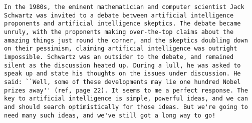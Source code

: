 \begin{lstlisting}
In the 1980s, the eminent mathematician and computer scientist Jack Schwartz was invited to a debate between artificial intelligence proponents and artificial intelligence skeptics. The debate became unruly, with the proponents making over-the-top claims about the amazing things just round the corner, and the skeptics doubling down on their pessimism, claiming artificial intelligence was outright impossible. Schwartz was an outsider to the debate, and remained silent as the discussion heated up. During a lull, he was asked to speak up and state his thoughts on the issues under discussion. He said: ``Well, some of these developments may lie one hundred Nobel prizes away'' (ref, page 22). It seems to me a perfect response. The key to artificial intelligence is simple, powerful ideas, and we can and should search optimistically for those ideas. But we're going to need many such ideas, and we've still got a long way to go!




\end{lstlisting}
